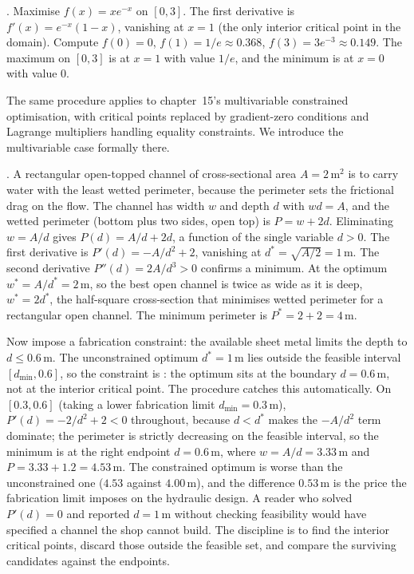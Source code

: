 . Maximise $f(x) = x e^{-x}$
on $[0, 3]$. The first derivative is $f'(x) = e^{-x} (1 - x)$,
vanishing at $x = 1$ (the only interior critical point in the
domain). Compute $f(0) = 0$, $f(1) = 1/e \approx 0.368$, $f(3) =
3 e^{-3} \approx 0.149$. The maximum on $[0, 3]$ is at $x = 1$
with value $1/e$, and the minimum is at $x = 0$ with value $0$.

The same procedure applies to chapter~15's multivariable
constrained optimisation, with critical points replaced by
gradient-zero conditions and Lagrange multipliers handling
equality constraints. We introduce the multivariable case
formally there.

.
A rectangular open-topped channel of cross-sectional area $A =
2\,\si{\meter\squared}$ is to carry water with the least wetted
perimeter, because the perimeter sets the frictional drag on the
flow. The channel has width $w$ and depth $d$ with $w d = A$, and
the wetted perimeter (bottom plus two sides, open top) is $P = w +
2 d$. Eliminating $w = A/d$ gives $P(d) = A/d + 2 d$, a function of
the single variable $d > 0$. The first derivative is $P'(d) = -A/
d^{2} + 2$, vanishing at $d^{*} = \sqrt{A/2} = 1\,\si{\meter}$. The
second derivative $P''(d) = 2 A/d^{3} > 0$ confirms a minimum. At
the optimum $w^{*} = A/d^{*} = 2\,\si{\meter}$, so the best
open channel is twice as wide as it is deep, $w^{*} = 2 d^{*}$, the
half-square cross-section that minimises wetted perimeter for a
rectangular open channel. The minimum perimeter is $P^{*} =
2 + 2 = 4\,\si{\meter}$.

Now impose a fabrication constraint: the available sheet metal
limits the depth to $d \leq 0.6\,\si{\meter}$. The unconstrained
optimum $d^{*} = 1\,\si{\meter}$ lies outside the feasible interval
$[d_{\min}, 0.6]$, so the constraint is : the
optimum sits at the boundary $d = 0.6\,\si{\meter}$, not at the
interior critical point. The procedure catches this automatically.
On $[0.3, 0.6]$ (taking a lower fabrication limit $d_{\min} =
0.3\,\si{\meter}$), $P'(d) = -2/d^{2} + 2 < 0$ throughout, because
$d < d^{*}$ makes the $-A/d^{2}$ term dominate; the perimeter is
strictly decreasing on the feasible interval, so the minimum is at
the right endpoint $d = 0.6\,\si{\meter}$, where $w = A/d = 3.33\,
\si{\meter}$ and $P = 3.33 + 1.2 = 4.53\,\si{\meter}$. The
constrained optimum is worse than the unconstrained one ($4.53$
against $4.00\,\si{\meter}$), and the difference $0.53\,\si{\meter}$
is the price the fabrication limit imposes on the hydraulic design.
A reader who solved $P'(d) = 0$ and reported $d = 1\,\si{\meter}$
without checking feasibility would have specified a channel the
shop cannot build. The discipline is to find the interior critical
points, discard those outside the feasible set, and compare the
surviving candidates against the endpoints.

